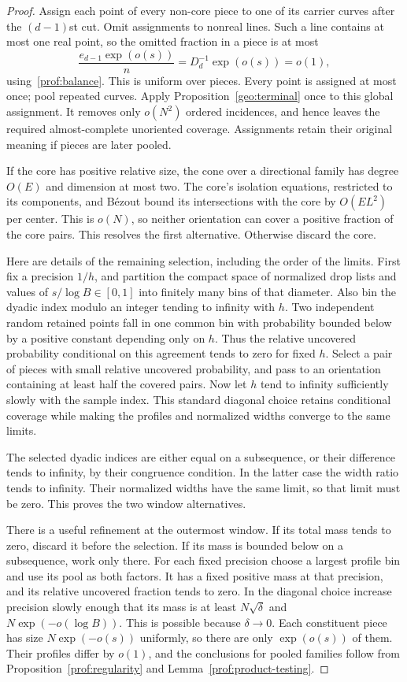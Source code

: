\begin{proof}
Assign each point of every non-core piece to one of its carrier
curves after the $(d-1)$st cut.  Omit assignments to nonreal lines.
Such a line contains at most one real point, so the omitted
fraction in a piece is at most
\[
 \frac{e_{d-1}\exp(o(s))}{n}
 =D_d^{-1}\exp(o(s))=o(1),
\]
using~\eqref{prof:balance}.  This is uniform over pieces.  Every
point is assigned at most once; pool repeated curves.  Apply
Proposition~\ref{geo:terminal} once to this global assignment.  It removes
only $o(N^2)$ ordered incidences, and hence leaves the required
almost-complete unoriented coverage.  Assignments retain their
original meaning if pieces are later pooled.

If the core has positive relative size, the cone over a
directional family has degree $O(E)$ and dimension at most two.
The core's isolation equations, restricted to its components,
and B\'ezout bound its intersections with the core by $O(EL^2)$
per center.  This is $o(N)$, so neither orientation can cover a
positive fraction of the core pairs.  This resolves the first
alternative.  Otherwise discard the core.

Here are details of the remaining selection, including the order
of the limits.  First fix a precision $1/h$, and partition the
compact space of normalized drop lists and values of
$s/\log B\in[0,1]$ into finitely many bins of that diameter.
Also bin the dyadic index modulo an integer tending to infinity
with $h$.  Two independent random retained points fall in one
common bin with probability bounded below by a positive constant
depending only on $h$.  Thus the relative uncovered probability
conditional on this agreement tends to zero for fixed $h$.
Select a pair of pieces with small relative uncovered
probability, and pass to an orientation containing at least half
the covered pairs.  Now let $h$ tend to infinity sufficiently
slowly with the sample index.  This standard diagonal choice
retains conditional coverage while making the profiles and
normalized widths converge to the same limits.

The selected dyadic indices are either equal on a subsequence,
or their difference tends to infinity, by their congruence
condition.  In the latter case the width ratio tends to infinity.
Their normalized widths have the same limit, so that limit must
be zero.  This proves the two window alternatives.

There is a useful refinement at the outermost window.  If its
total mass tends to zero, discard it before the selection.  If
its mass is bounded below on a subsequence, work only there.
For each fixed precision choose a largest profile bin and use
its pool as both factors.  It has a fixed positive mass at that
precision, and its relative uncovered fraction tends to zero.
In the diagonal choice increase precision slowly enough that
its mass is at least $N\sqrt\delta$ and
$N\exp(-o(\log B))$.  This is possible because $\delta\to0$.
Each constituent piece has size $N\exp(-o(s))$ uniformly, so
there are only $\exp(o(s))$ of them.  Their profiles differ by
$o(1)$, and the conclusions for pooled families follow from
Proposition~\ref{prof:regularity} and
Lemma~\ref{prof:product-testing}.


\end{proof}
